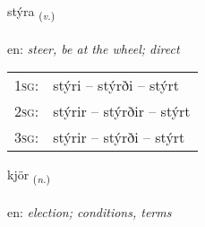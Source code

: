 \documentclass[frontgrid, backgrid]{flacards}\usepackage[]{graphicx}\usepackage[]{color}
\begin{document}
\renewcommand{\flhead}{\vskip5pt \fboxsep=0pt {\small\bfseries\footnotesize Sagnorð | Verb}}
\renewcommand{\fcfoot}{\vskip5pt \fboxsep=0pt \hspace{2pt}{\small\bfseries\footnotesize 2K}}

\renewcommand{\blhead}{\vskip5pt {\small\bfseries\footnotesize Sagnorð | Verb }}
\renewcommand{\bcfoot}{\vskip5pt \hspace{2pt}{\small\bfseries\footnotesize 2K}}


{stýra \small{\textsubscript{(\textit{v.})}} \\[1ex] %
\textphonetic{[stiːra]} \\
en: \emph{steer, be at the wheel; direct} \\  [2ex]
\renewcommand*{\arraystretch}{0.8}
\begin{tabular}{p{1cm}l}
\textsc{1sg}: & stýri -- stýrði -- stýrt \\ 
\textsc{2sg}: & stýrir -- stýrðir -- stýrt \\ 
\textsc{3sg}: & stýrir -- stýrði -- stýrt \\ 
\end{tabular}
}

\renewcommand{\flhead}{\vskip5pt \fboxsep=0pt {\small\bfseries\footnotesize Nafnorð | Noun}}
\renewcommand{\fcfoot}{\vskip5pt \fboxsep=0pt \hspace{2pt}{\small\bfseries\footnotesize 2K}}

\renewcommand{\blhead}{\vskip5pt {\small\bfseries\footnotesize Nafnorð | Noun }}
\renewcommand{\bcfoot}{\vskip5pt \hspace{2pt}{\small\bfseries\footnotesize 2K}}


{kjör \small{\textsubscript{(\textit{n.})}} \\[1ex] %
\textphonetic{[cʰœːr]} \\
en: \emph{election; conditions, terms} \\  [2ex]
\renewcommand*{\arraystretch}{0.8}
}
\end{document}
